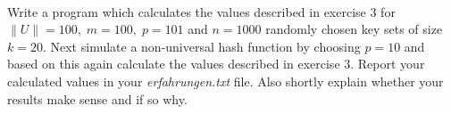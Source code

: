  \\
Write a program which calculates the values described in exercise 3 for
$\|U\| = 100, \; m = 100, \; p = 101$ and $n = 1000$ randomly chosen key sets
of size $k = 20$.
Next simulate a non-universal hash function by choosing $p = 10$ and based on
this again calculate the values described in exercise 3.
Report your calculated values in your \textit{erfahrungen.txt} file. Also shortly 
explain whether your results make sense and if so why.

